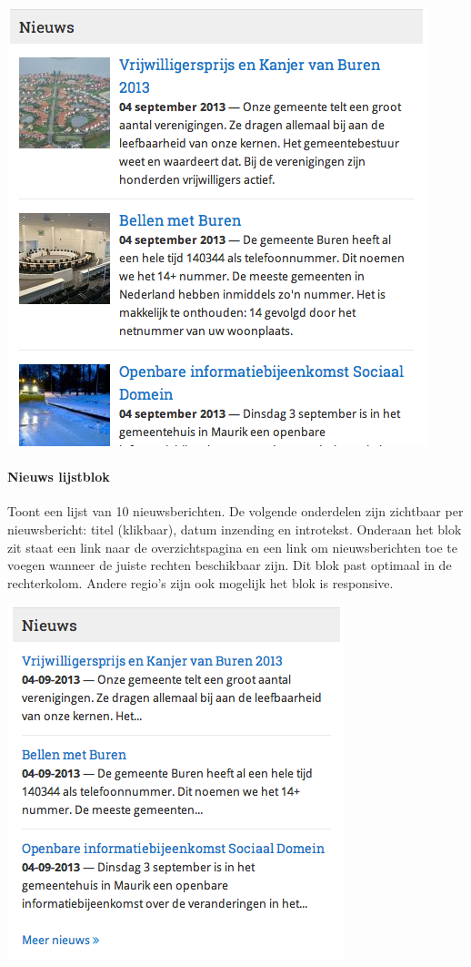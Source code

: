 \begin{center}
	\includegraphics[scale=0.5]{img/blokken/nieuwsteaser.png}
\end{center}

\paragraph{Nieuws lijstblok}

Toont een lijst van 10 nieuwsberichten. De volgende onderdelen zijn zichtbaar per nieuwsbericht: titel (klikbaar), datum inzending en introtekst. Onderaan het blok zit staat een link naar de overzichtspagina en een link om nieuwsberichten toe te voegen wanneer de juiste rechten beschikbaar zijn. Dit blok past optimaal in de rechterkolom. Andere regio's zijn ook mogelijk het blok is responsive.

\begin{center}
	\includegraphics[scale=0.5]{img/blokken/nieuwslist.png}
\end{center}

